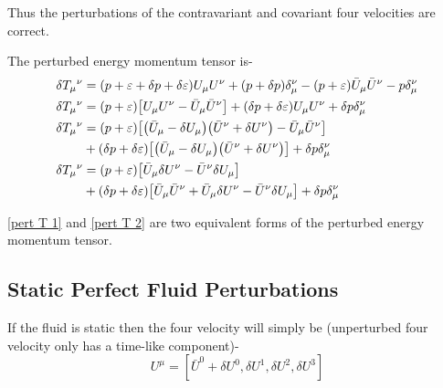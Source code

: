 \documentclass[12pt, letterpaper]{report}
\begin{document}
Thus the perturbations of the contravariant and covariant four velocities are correct. 

The perturbed energy momentum tensor is- 
\begin{align}
    \delta T_\mu{}^\nu &= \qty(p+\varepsilon+ \delta p+\delta\varepsilon)U_\mu U^\nu + \qty(p+\delta p)\delta_\mu^\nu - \qty(p+\varepsilon)\bar{U}_\mu \bar{U}^\nu - p\delta_\mu^\nu \nonumber\\
    \delta T_\mu{}^\nu &= \qty(p+\varepsilon)\qty[U_\mu U^\nu- \bar{U}_\mu \bar{U}^\nu]+\qty(\delta p+\delta\varepsilon)U_\mu U^\nu + \delta p\delta_\mu^\nu \label{pert T 1}\\
    \delta T_\mu{}^\nu &= \qty(p+\varepsilon)\qty[\qty(\bar{U}_\mu-\delta U_\mu)\qty(\bar{U}^\nu+ \delta U^\nu)- \bar{U}_\mu \bar{U}^\nu] \nonumber\\
    &+\qty(\delta p+\delta\varepsilon)\qty[\qty(\bar{U}_\mu-\delta U_\mu)\qty(\bar{U}^\nu+ \delta U^\nu)] + \delta p\delta_\mu^\nu \nonumber\\
    \delta T_\mu{}^\nu &= \qty(p+\varepsilon)\qty[\bar{U}_\mu \delta U^\nu-\bar{U}^\nu \delta U_\mu] \nonumber\\
    &+\qty(\delta p+\delta\varepsilon)\qty[\bar{U}_\mu \bar{U}^\nu+\bar{U}_\mu \delta U^\nu-\bar{U}^\nu \delta U_\mu] + \delta p\delta_\mu^\nu \label{pert T 2}
\end{align}

\cref{pert T 1} and \cref{pert T 2} are two equivalent forms of the perturbed energy momentum tensor. 

\subsection{Static Perfect Fluid Perturbations}

If the fluid is static then the four velocity will simply be (unperturbed four velocity only has a time-like component)-$${U}^\mu=[\bar{U}^0+\delta U^0, \delta U^1, \delta U^2, \delta U^3]$$ 
\end{document}
